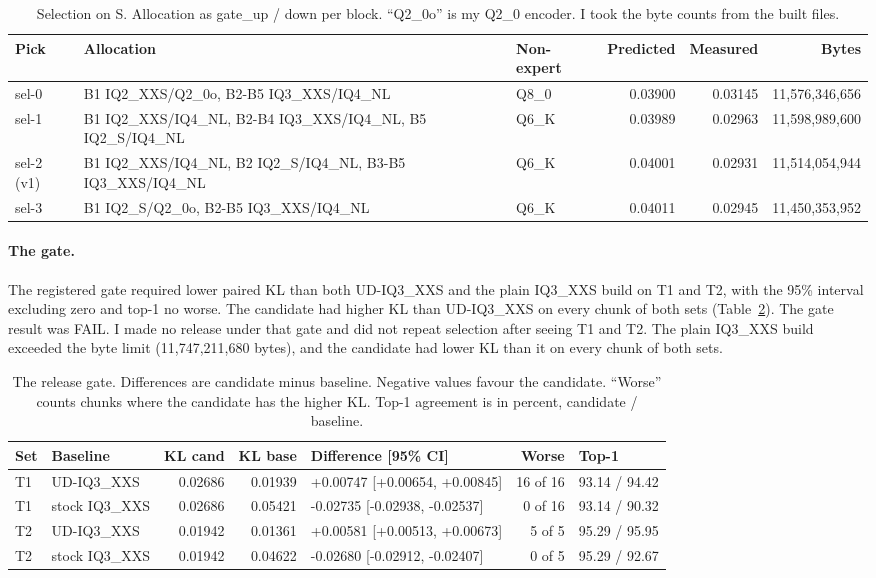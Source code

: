\documentclass[11pt,a4paper]{article}
\begin{document}
\begin{table}[t]
\centering\footnotesize
\caption{Selection on S. Allocation as gate\_up / down per block. ``Q2\_0o'' is my Q2\_0 encoder. I took the byte counts from the built files.}
\label{tab:sel}
\begin{tabular}{>{\raggedright\arraybackslash}p{1.3cm}>{\raggedright\arraybackslash}p{5.6cm}lrrr}
\toprule
Pick & Allocation & Non-expert & Predicted & Measured & Bytes \\
\midrule
sel-0 & B1 IQ2\_XXS/Q2\_0o, B2-B5 IQ3\_XXS/IQ4\_NL & Q8\_0 & 0.03900 & 0.03145 & 11,576,346,656 \\
sel-1 & B1 IQ2\_XXS/IQ4\_NL, B2-B4 IQ3\_XXS/IQ4\_NL, B5 IQ2\_S/IQ4\_NL & Q6\_K & 0.03989 & 0.02963 & 11,598,989,600 \\
sel-2 (v1) & B1 IQ2\_XXS/IQ4\_NL, B2 IQ2\_S/IQ4\_NL, B3-B5 IQ3\_XXS/IQ4\_NL & Q6\_K & 0.04001 & 0.02931 & 11,514,054,944 \\
sel-3 & B1 IQ2\_S/Q2\_0o, B2-B5 IQ3\_XXS/IQ4\_NL & Q6\_K & 0.04011 & 0.02945 & 11,450,353,952 \\
\bottomrule
\end{tabular}
\end{table}

\paragraph{The gate.} The registered gate required lower paired KL than both UD-IQ3\_XXS and the plain IQ3\_XXS build on T1 and T2, with the 95\% interval excluding zero and top-1 no worse. The candidate had higher KL than UD-IQ3\_XXS on every chunk of both sets (Table~\ref{tab:gate}). The gate result was FAIL. I made no release under that gate and did not repeat selection after seeing T1 and T2. The plain IQ3\_XXS build exceeded the byte limit (11,747,211,680 bytes), and the candidate had lower KL than it on every chunk of both sets.

\begin{table}[t]
\centering\footnotesize
\caption{The release gate. Differences are candidate minus baseline. Negative values favour the candidate. ``Worse'' counts chunks where the candidate has the higher KL. Top-1 agreement is in percent, candidate / baseline.}
\label{tab:gate}
\begin{tabular}{llrrlrl}
\toprule
Set & Baseline & KL cand & KL base & Difference [95\% CI] & Worse & Top-1 \\
\midrule
T1 & UD-IQ3\_XXS & 0.02686 & 0.01939 & +0.00747 [+0.00654, +0.00845] & 16 of 16 & 93.14 / 94.42 \\
T1 & stock IQ3\_XXS & 0.02686 & 0.05421 & -0.02735 [-0.02938, -0.02537] & 0 of 16 & 93.14 / 90.32 \\
T2 & UD-IQ3\_XXS & 0.01942 & 0.01361 & +0.00581 [+0.00513, +0.00673] & 5 of 5 & 95.29 / 95.95 \\
T2 & stock IQ3\_XXS & 0.01942 & 0.04622 & -0.02680 [-0.02912, -0.02407] & 0 of 5 & 95.29 / 92.67 \\
\bottomrule
\end{tabular}
\end{table}
\end{document}
